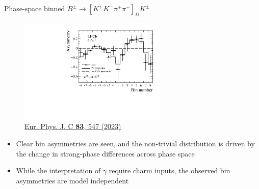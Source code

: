 \documentclass[xcolor={dvipsnames}]{beamer}
\begin{document}
\begin{frame}{Phase-space binned $B^\pm\to[K^+K^-\pi^+\pi^-]_DK^\pm$}
  \begin{figure}
    \includegraphics[height = 5cm]{Plots/BinAsymmetries_dk.pdf}
    \vspace{-0.4cm}
    \caption*{\tiny\href{https://link.springer.com/article/10.1140/epjc/s10052-023-11560-5}{Eur. Phys. J. C \textbf{83}, 547 (2023)}}
  \end{figure}
  \vspace{-0.5cm}
  \begin{itemize}
    \setlength\itemsep{0.5em}
    \item{Clear bin asymmetries are seen, and the non-trivial distribution is driven by the change in strong-phase differences across phase space}
    \item{While the interpretation of $\gamma$ require charm inputs, the observed bin asymmetries are model independent}
  \end{itemize}
\end{frame}
\end{document}

